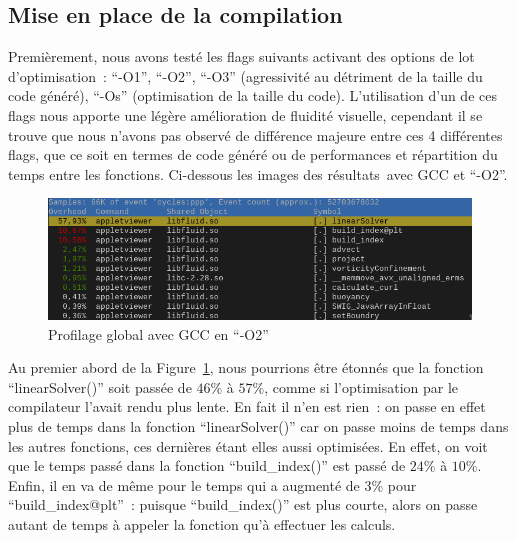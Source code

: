 \documentclass[12pt,a4paper]{article}
\begin{document}
\subsection{Mise en place de la compilation}
\label{sub.optim.compil}

Premièrement, nous avons testé les flags suivants activant des options de lot
d’optimisation : \enquote{-O1}, \enquote{-O2}, \enquote{-O3} (agressivité au
détriment de la taille du code généré), \enquote{-Os} (optimisation de la taille
du code). L’utilisation d’un de ces flags nous apporte une légère amélioration
de fluidité visuelle, cependant il se trouve que nous n’avons pas observé de
différence majeure entre ces 4 différentes flags, que ce soit en termes de code
généré ou de performances et répartition du temps entre les fonctions.
Ci-dessous les images des résultats avec \ac{GCC} et \enquote{-O2}.

\begin{figure}
    \centering
    \includegraphics[scale=0.58]{figures/optims/gcc-O2/global.png}
    \caption{Profilage global avec \ac{GCC} en \enquote{-O2}}
    \label{fig.optim.compil.gcc.global}
\end{figure}

Au premier abord de la Figure~\ref{fig.optim.compil.gcc.global}, nous pourrions
être étonnés que la fonction \enquote{linearSolver()} soit passée de $46\%$ à
$57\%$, comme si l’optimisation par le compilateur l’avait rendu plus lente. En
fait il n’en est rien : on passe en effet plus de temps dans la fonction
\enquote{linearSolver()} car on passe moins de temps dans les autres fonctions,
ces dernières étant elles aussi optimisées. En effet, on voit que le temps passé
dans la fonction \enquote{build\_index()} est passé de $24\%$ à $10\%$. Enfin,
il en va de même pour le temps qui a augmenté de $3\%$ pour
\enquote{build\_index@plt} : puisque \enquote{build\_index()} est plus courte,
alors on passe autant de temps à appeler la fonction qu’à effectuer les calculs.
\end{document}
